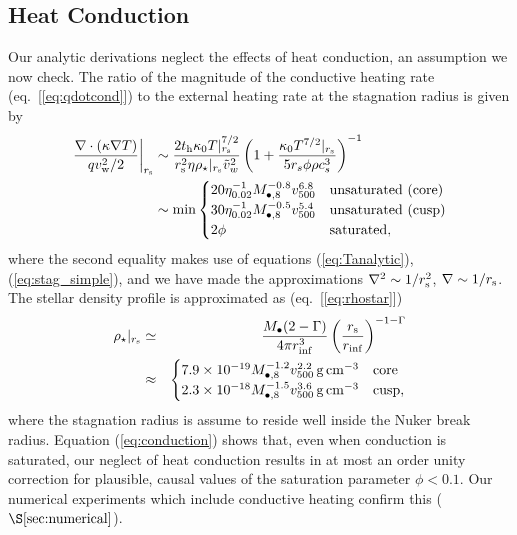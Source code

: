 \documentclass[usenatbib,fleqn]{mn2e}
\newcommand{\rs}{r_s}
\begin{document}
\subsection{Heat Conduction}
\label{sec:conductivity}

Our analytic derivations neglect the effects of heat conduction, an
assumption we now check.  The ratio of the magnitude of the conductive
heating rate (eq.~[\ref{eq:qdotcond}]) to the external heating rate at
the stagnation radius is given by
\begin{align}
  \left.\frac{\nabla\cdot(\kappa \nabla T)}{q v_{\rm
w}^{2}/2}\right|_{r_{\rm s}} &\sim \frac{2t_{\rm h}\kappa_0
T|_{r_{\rm s}}^{7/2}}{r_{\rm s}^{2}\eta \rho_{\star}|_{r_{\rm s}}
\tilde{v}_{w}^{2}}
 \left(1+\frac{\kappa_0 T^{7/2}|_{r_{\rm s}}}{5 \rs
    \phi \rho c_s^3}\right)^{-1}
\nonumber \\ &\sim {\rm min}
  \begin{cases}
  20 \eta_{0.02}^{-1}
M_{\bullet,8}^{-0.8} v_{500}^{6.8} &  \text{unsaturated (core)}\\
 30 \eta_{0.02}^{-1}
M_{\bullet,8}^{-0.5} v_{500}^{5.4} &  \text{unsaturated (cusp)}\\
  2 \phi & \text{saturated},
  \end{cases}
 \label{eq:conduction}
\end{align}
where the second equality makes use of equations (\ref{eq:Tanalytic}),
(\ref{eq:stag_simple}), and we have made the approximations $\nabla^{2} \sim
1/r_{\rm s}^{2}$, $\nabla \sim 1/r_{\rm s}$.  The
stellar density profile is approximated as (eq.~[\ref{eq:rhostar}])
\begin{eqnarray}
  \rho_{\star}|_{r_{\rm s}} &\simeq& \frac{M_{\bullet}(2-\Gamma)}{4\pi r_{\rm inf}^{3}}\left(\frac{r_{\rm s}}{r_{\rm inf}}\right)^{-1-\Gamma} \nonumber \\
 &\approx& \begin{cases}
    7.9 \times 10^{-19}M_{\bullet,8}^{-1.2}v_{500}^{2.2}\,{\rm g\,cm^{-3}}
    & \text{core} \\
    2.3 \times 10^{-18} M_{\bullet,8}^{-1.5}v_{500}^{3.6}
    \,{\rm g\,cm^{-3}}  & \text{cusp}, 
  \end{cases}
  \label{eq:rhostarrs}
\end{eqnarray}
where the stagnation radius is assume to reside well inside the Nuker
break radius.  Equation (\ref{eq:conduction}) shows that, even when conduction is saturated, our neglect of heat conduction
results in at most an order unity correction for plausible, causal values of
the saturation parameter $\phi < 0.1$.  Our numerical experiments which include conductive heating confirm this
($\S\ref{sec:numerical}$).
\end{document}

